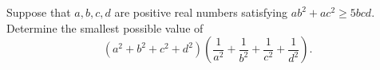 Suppose that $a,b,c,d$ are positive real numbers satisfying $ab^2 + ac^2 \ge 5bcd$.
Determine the smallest possible value of
$$\left(a^2 + b^2 + c^2 + d^2\right)\left(\frac{1}{a^2}+\frac{1}{b^2}+\frac{1}{c^2}+\frac{1}{d^2}\right).$$
